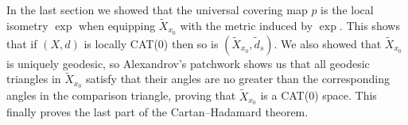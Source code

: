 \documentclass[11pt, a4paper, oneside]{memoir}
\theoremstyle{plain}\newtheorem{theorem}[subsection]{Theorem}
\theoremstyle{definition}
\newcommand{\twiddle}[1]{\widetilde{#1}}
\begin{document}
In the last section we showed that the universal covering map \(p\) is the local isometry $\exp$ when equipping \(\twiddle{X}_{x_0}\) with the metric induced by $\exp$.
This shows that if \((X,d)\) is locally CAT(0) then so is \((\twiddle{X}_{x_0},\twiddle{d}_s)\).
We also showed that \(\twiddle{X}_{x_0}\) is uniquely geodesic, so Alexandrov's patchwork shows us that all geodesic triangles in \(\twiddle{X}_{x_0}\) satisfy that their angles are no greater than the corresponding angles in the comparison triangle, proving that \(\twiddle{X}_{x_0}\) is a CAT(0) space. 
This finally proves the last part of the Cartan--Hadamard theorem.





\begin{bibdiv}
\begin{biblist}


   
    
\end{biblist}
\end{bibdiv}
    
\end{document}
